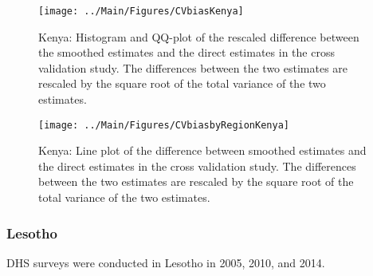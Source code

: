 \documentclass[12pt]{article}\usepackage[]{graphicx}\usepackage[]{color}
\newenvironment{knitrout}{}{} %
\begin{document}
\begin{knitrout}
\color{fgcolor}\begin{figure}[bht]

{\centering \texttt{[image: ../Main/Figures/CVbiasKenya]} 

}

\caption[Kenya]{Kenya: Histogram and QQ-plot of the rescaled difference between the smoothed estimates and the direct estimates in the cross validation study. The differences between the two estimates are rescaled by the square root of the total variance of the two estimates.}\label{fig:unnamed-chunk-169}
\end{figure}


\end{knitrout}

\begin{knitrout}
\color{fgcolor}\begin{figure}[bht]

{\centering \texttt{[image: ../Main/Figures/CVbiasbyRegionKenya]} 

}

\caption[Kenya]{Kenya: Line plot of the difference between smoothed estimates and the direct estimates in the cross validation study. The differences between the two estimates are rescaled by the square root of the total variance of the two estimates.}\label{fig:unnamed-chunk-170}
\end{figure}


\end{knitrout}


\clearpage
\subsubsection{Lesotho}





DHS surveys were conducted in Lesotho in 2005, 2010, and 2014.
\end{document}
